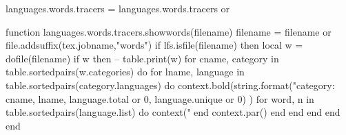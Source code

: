 
\startluacode
languages.words.tracers = languages.words.tracers or { }

function languages.words.tracers.showwords(filename)
    filename = filename or file.addsuffix(tex.jobname,"words")
    if lfs.isfile(filename) then
        local w = dofile(filename)
        if w then
         -- table.print(w)
            for cname, category in table.sortedpairs(w.categories) do
                for lname, language in table.sortedpairs(category.languages) do
                    context.bold(string.format("category: %
                        cname, lname, language.total or 0, language.unique or 0)
                    )
                    for word, n in table.sortedpairs(language.list) do
                        context(" %
                    end
                    context.par()
                end
            end
        end
    end
end
\stopluacode


